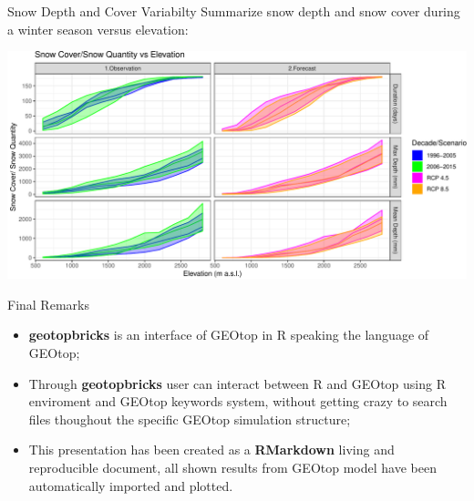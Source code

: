 \documentclass[
  ignorenonframetext,
]{beamer}
\providecommand{\tightlist}{%
  \setlength{\itemsep}{0pt}\setlength{\parskip}{0pt}}
\begin{document}
\begin{frame}{Snow Depth and Cover Variabilty}
\protect\hypertarget{snow-depth-and-cover-variabilty}{}
Summarize snow depth and snow cover during a winter season versus
elevation:

\begin{center}\includegraphics[width=0.9\linewidth]{presentation_files/figure-beamer/snow-altitude-1} \end{center}
\end{frame}

\begin{frame}{Final Remarks}
\protect\hypertarget{final-remarks}{}
\begin{itemize}
\item
  \textbf{geotopbricks} is an interface of GEOtop in R speaking the
  language of GEOtop;
\item
  Through \textbf{geotopbricks} user can interact between R and GEOtop
  using R enviroment and GEOtop keywords system, without getting crazy
  to search files thoughout the specific GEOtop simulation structure;
\end{itemize}

\begin{itemize}
\tightlist
\item
  This presentation has been created as a \textbf{RMarkdown} living and
  reproducible document, all shown results from GEOtop model have been
  automatically imported and plotted.
\end{itemize}
\end{frame}
\end{document}

